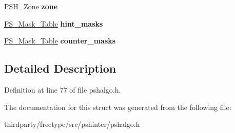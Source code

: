 \begin{DoxyCompactItemize}
\hyperlink{struct_p_s_h___zone_rec__}{P\+S\+H\+\_\+\+Zone} {\bfseries zone}
\item 
\mbox{\label{struct_p_s_h___hint___table_rec___a4131293707d0986ab63bc96ca580356c}} 
\hyperlink{struct_p_s___mask___table_rec__}{P\+S\+\_\+\+Mask\+\_\+\+Table} {\bfseries hint\+\_\+masks}
\item 
\mbox{\label{struct_p_s_h___hint___table_rec___ac0632dc8f0e42a791c13f7c184b87ffe}} 
\hyperlink{struct_p_s___mask___table_rec__}{P\+S\+\_\+\+Mask\+\_\+\+Table} {\bfseries counter\+\_\+masks}
\end{DoxyCompactItemize}


\subsection{Detailed Description}


Definition at line 77 of file pshalgo.\+h.



The documentation for this struct was generated from the following file\+:\begin{DoxyCompactItemize}
\item 
thirdparty/freetype/src/pshinter/pshalgo.\+h\end{DoxyCompactItemize}
